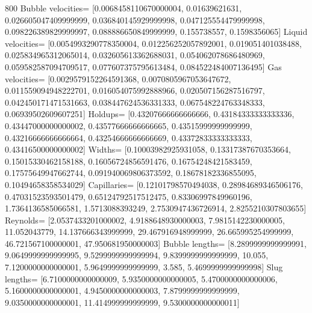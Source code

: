 \documentclass{article}
\begin{document}
800
Bubble velocities= [0.0068458110670000004, 0.01639621631, 0.026605047409999999,
0.036840145929999998, 0.047125554479999998, 0.098226389829999997, 0.088886650849999999, 0.155738557,
0.1598356065]
Liquid velocities= [0.0054993290778350004, 0.012256252057892001, 0.019051401038488,
0.025834965312065014, 0.032605613362688031, 0.054062078686480969, 0.059582587094709517,
0.077607375795613484, 0.084522484007136495]
Gas velocities= [0.0029579152264591368, 0.0070805967053647672, 0.011559094948222701,
0.016054075992888966, 0.020507156287516797, 0.042450171471531663, 0.038447624536331333,
0.067548224763348333, 0.06939502609607251]
Holdups= [0.43207666666666666, 0.43184333333333336, 0.43447000000000002, 0.43577666666666665,
0.43515999999999999, 0.43216666666666664, 0.43254666666666669, 0.43372833333333333,
0.43416500000000002]
Widths= [0.10003982925931058, 0.13317387670353664, 0.15015330462158188, 0.16056724856591476,
0.16754248421583459, 0.17575649947662744, 0.091940069806373592, 0.18678182336855095,
0.10494658358534029]
Capillaries= [0.12101798570494038, 0.28984689346506176, 0.47031523593501479, 0.65124792517512475,
0.83306997849960196, 1.7364136585066581, 1.5713088393249, 2.7530947436726914, 2.8255210307803655]
Reynolds= [2.0537433201000002, 4.9188648930000003, 7.9815142230000005, 11.052043779,
14.137666343999999, 29.467916948999999, 26.665995254999999, 46.721567100000001, 47.950681950000003]
Bubble lengths= [8.2899999999999991, 9.0649999999999995, 9.5299999999999994, 9.8399999999999999,
10.055, 7.1200000000000001, 5.9649999999999999, 3.585, 5.4699999999999998]
Slug lengths= [6.7100000000000009, 5.9350000000000005, 5.4700000000000006, 5.1600000000000001,
4.9450000000000003, 7.8799999999999999, 9.0350000000000001, 11.414999999999999, 9.5300000000000011]
\end{document}
